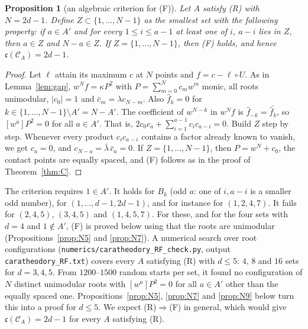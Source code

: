 \documentclass[11pt]{amsart}
\newtheorem{proposition}[theorem]{Proposition}
\theoremstyle{remark}
\newcommand{\cc}{\mathfrak{c}}
\begin{document}
\begin{proposition}[an algebraic criterion for (F)]\label{prop:closure}
Let $A$ satisfy (R) with $N=2d-1$. Define $Z\subset\{1,\dots,N-1\}$ as the smallest set with the following property: if $a\in A'$ and for every $1\le i\le a-1$ at least one of
$i$, $a-i$ lies in $Z$, then $a\in Z$ and $N-a\in Z$. If $Z=\{1,\dots,N-1\}$, then (F) holds, and hence $\cc(\mathcal C_A)=2d-1$.
\end{proposition}
\begin{proof}
Let $\ell$ attain its maximum $c$ at $N$ points and $f=c-\ell\circ U$. As in Lemma~\ref{lem:gap}, $w^Nf=\kappa P^2$ with $P=\sum_{m=0}^Nc_mw^m$ monic, all roots unimodular, $|c_0|=1$ and
$\bar c_m=\lambda c_{N-m}$. Also $\hat f_k=0$ for $k\in\{1,\dots,N-1\}\setminus A'=N-A'$. The coefficient of $w^{N-k}$ in $w^Nf$ is $\hat f_{-k}=\overline{\hat f_k}$, so $[w^a]P^2=0$ for all $a\in A'$.
That is, $2c_0c_a+\sum_{i=1}^{a-1}c_ic_{a-i}=0$. Build $Z$ step by step. Whenever every product $c_ic_{a-i}$ contains a factor already known to vanish, we get $c_a=0$, and
$c_{N-a}=\bar\lambda\,\bar c_a=0$. If $Z=\{1,\dots,N-1\}$, then $P=w^N+c_0$, the contact points are equally spaced, and (F) follows as in the proof of Theorem~\ref{thm:C}.
\end{proof}

\noindent The criterion requires $1\in A'$. It holds for $B_k$ (odd $a$: one of $i,a-i$ is a smaller odd number), for $(1,\dots,d-1,2d-1)$, and for instance for $(1,2,4,7)$. It
fails for $(2,4,5)$, $(3,4,5)$ and $(1,4,5,7)$. For these, and for the four sets with $d=4$ and $1\notin A'$, (F) is proved below using that the roots are unimodular
(Propositions~\ref{prop:N5} and \ref{prop:N7}).
A numerical search over root configurations (\texttt{numerics/caratheodory\_RF\_check.py}, output \texttt{caratheodory\_RF.txt}) covers every $A$ satisfying (R)
with $d\le5$: $4$, $8$ and $16$ sets for $d=3,4,5$. From $1200$--$1500$ random starts per set, it found no configuration of $N$ distinct unimodular roots
with $[w^a]P^2=0$ for all $a\in A'$ other than the equally spaced one. Propositions~\ref{prop:N5}, \ref{prop:N7} and \ref{prop:N9} below turn this into a proof for
$d\le5$.
We expect (R)$\Rightarrow$(F) in general, which would give $\cc(\mathcal C_A)=2d-1$ for every $A$ satisfying (R).
\end{document}

